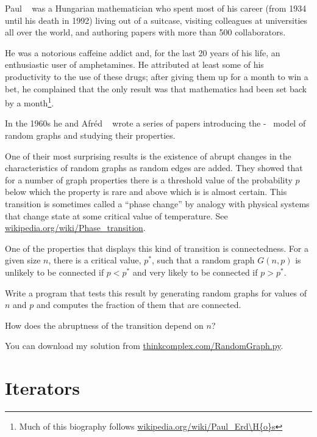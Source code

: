 \documentclass[10pt]{book}
\begin{document}
Paul \Erdos~ was a Hungarian mathematician who spent most
of his career (from 1934 until his death in 1992) living out
of a suitcase, visiting colleagues at universities all over the
world, and authoring papers with more than 500 collaborators.

He was a notorious caffeine addict and, for the last 20 years of his
life, an enthusiastic user of amphetamines.  He attributed at least
some of his productivity to the use of these drugs; after giving them
up for a month to win a bet, he complained that the only result
was that mathematics had
been set back by a month\footnote{Much of this biography follows
\url{wikipedia.org/wiki/Paul_Erd\H{o}s}}.

In the 1960s he and Afr\'{e}d \Renyi~ wrote a series of papers 
introducing the \Erdos-\Renyi~
model of random graphs and studying their properties.

One of their most surprising results is the existence of
abrupt changes in the characteristics of random graphs as
random edges are added.  They showed that for a number of
graph properties there is a threshold value of the probability
$p$ below which the property is rare and above which is
is almost certain.  This transition is sometimes called
a ``phase change'' by analogy with physical systems that
change state at some critical value of temperature.
See \url{wikipedia.org/wiki/Phase_transition}.


\begin{ex}

One of the properties that displays this kind of transition is
connectedness.  For a given size $n$, there is a critical value,
$p^*$, such that a random graph $G(n, p)$ is unlikely to be connected
if $p < p^*$ and very likely to be connected if $p > p^*$.

Write a program that tests this result by generating random graphs for
values of $n$ and $p$ and computes the fraction of them that
are connected.

How does the abruptness of the transition depend on $n$?

You can download my solution from
\url{thinkcomplex.com/RandomGraph.py}.

\end{ex}


\section{Iterators}
\end{document}
